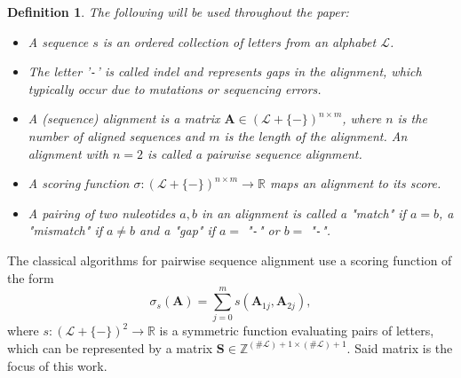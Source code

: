 \documentclass{article}
\newtheorem{definition}{Definition}
\begin{document}
\begin{definition}
    The following will be used throughout the paper:
    \begin{itemize}
        \item A \emph{sequence} $s$ is an ordered collection of letters from
              an alphabet $\mathcal{L}$.
        \item The letter '\texttt{-}' is called \emph{indel} and represents
              gaps in the alignment, which typically occur due to mutations or sequencing
              errors.

        \item A (sequence) alignment is a matrix $\mathbf A \in
                  (\mathcal{L} + \{\mathtt{-}\})^{n \times m}$, where $n$ is the number of aligned sequences and $m$ is the
              length of the alignment.
	      An alignment with $n = 2$ is called a \emph{pairwise sequence alignment.}
      \item A \emph{scoring function} $\sigma: (\mathcal{L} + \{\mathtt{-}\})^{n
                      \times m} \to \mathbb{R}$ maps an alignment to its score.
      \item A pairing of two nuleotides $a, b$  in an alignment is called a "\emph{match}" if $a = b$, a "\emph{mismatch"} if $a \ne b$ and a "\emph {gap}" if $a =$ "\texttt{-}" or $b =$ "\texttt{-}".
    \end{itemize}
\end{definition}


The classical algorithms for pairwise sequence alignment use a scoring function of the form
\begin{equation*}
	\sigma_s( \mathbf A )= \sum_{j=0}^m s(\mathbf A_{1j}, \mathbf A_{2j}),
\end{equation*} where $s:
    (\mathcal L + \{\mathtt{-}\})^2 \to \mathbb{R}$ is a symmetric function
evaluating pairs of letters, which can be represented by a matrix $\mathbf S
    \in \mathbb Z^{(\# \mathcal L) + 1 \times (\# \mathcal L) + 1}$. Said matrix is
the focus of this work.
\end{document}
